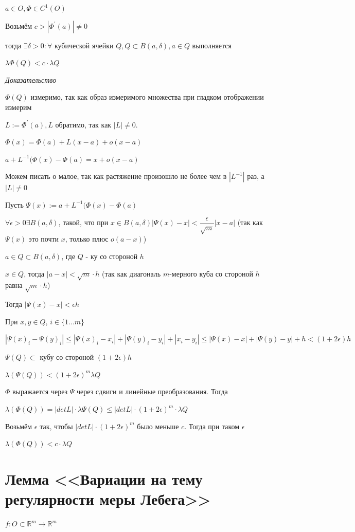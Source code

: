 \documentclass[paper=a4, fontsize=17pt]{article}
\begin{document}
$a \in O, \Phi \in C^1(O)$

Возьмём $c > |\Phi^{'}(a)| \neq 0$

тогда $\exists \delta > 0: \forall$ кубической ячейки $Q, Q \subset B(a, \delta), a \in Q$ выполняется

$\lambda \Phi(Q) < c \cdot \lambda Q$

\emph{Доказательство}

$\Phi(Q)$ измеримо, так как образ измеримого множества при гладком отображении измерим

$L := \Phi^{'}(a), L$ обратимо, так как $|L| \neq 0$.

$\Phi(x) = \Phi(a) + L(x - a) + o(x - a)$

$a + L^{-1} (\Phi(x) - \Phi(a) = x + o(x - a)$

Можем писать о малое, так как растяжение произошло не более чем в $|L^{-1}|$ раз, а $|L| \neq 0$

Пусть $\Psi(x) := a + L^{-1} (\Phi(x) - \Phi(a)$

$\forall \epsilon > 0 \exists B(a, \delta)$, такой, что при $x \in B(a, \delta) |\Psi(x) - x| < \dfrac{\epsilon}{\sqrt{m}} |x - a|$ (так как $\Psi(x)$ это почти $x$, только плюс $o(a - x)$)

$a \in Q \subset B(a, \delta)$, где $Q$ - ку со стороной $h$

$x \in Q$, тогда $|a - x| < \sqrt{m} \cdot h$ (так как диагональ $m$-мерного куба со стороной $h$ равна $\sqrt{m} \cdot h$)

Тогда $|\Psi(x) - x| < \epsilon h$

При $x, y \in Q$, $i \in \{1...m\}$

$|\Psi(x)_i - \Psi(y)_i| \leqslant |\Psi(x)_i - x_i| + |\Psi(y)_i - y_i| + |x_i - y_i| \leqslant |\Psi(x) - x| + |\Psi(y) - y| + h < (1 + 2 \epsilon)h$

$\Psi(Q) \subset$ кубу со стороной $(1 + 2 \epsilon) h$

$\lambda(\Psi(Q)) < (1 + 2 \epsilon)^m \lambda Q$

$\Phi$ выражается через $\Psi$ через сдвиги и линейные преобразования. Тогда

$\lambda(\Phi(Q)) = |det L| \cdot \lambda \Psi(Q) \leqslant |det L| \cdot (1 + 2 \epsilon)^m \cdot \lambda Q$

Возьмём $\epsilon$ так, чтобы $|det L| \cdot (1 + 2 \epsilon)^m$ было меньше $c$. Тогда при таком $\epsilon$

$\lambda(\Phi(Q)) < c \cdot \lambda Q$

\section{Лемма <<Вариации на тему регулярности меры Лебега>>}
$f: O \subset \mathds{R}^m \rightarrow \mathds{R}^m$
\end{document}
